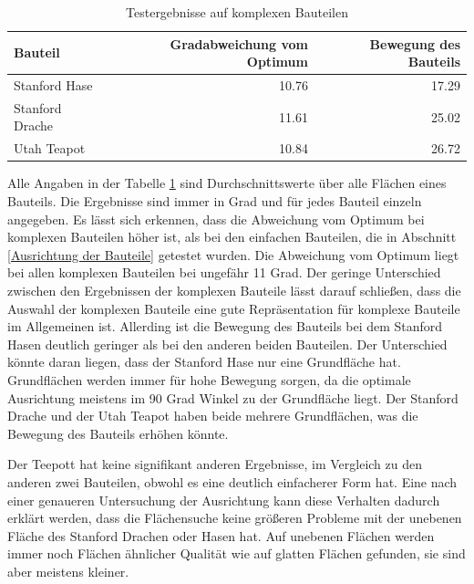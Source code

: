 \begin{table}[t]
\centering
\begin{tabular}{lrr}
\toprule
Bauteil & Gradabweichung vom Optimum & Bewegung des Bauteils\\
\midrule
Stanford Hase & 10.76 & 17.29 \\ \addlinespace
Stanford Drache & 11.61 & 25.02 \\ \addlinespace
Utah Teapot & 10.84 & 26.72\\
\bottomrule
\end{tabular}
\caption{Testergebnisse auf komplexen Bauteilen}
\label{table:Testergebnisse auf komplexen Bauteilen}
\end{table}

Alle Angaben in der Tabelle \ref{table:Testergebnisse auf komplexen Bauteilen} sind Durchschnittswerte über alle Flächen eines Bauteils. Die Ergebnisse sind immer in Grad und für jedes Bauteil einzeln angegeben. 
Es lässt sich erkennen, dass die Abweichung vom Optimum bei komplexen Bauteilen höher ist, als bei den einfachen Bauteilen, die in Abschnitt \ref{Ausrichtung der Bauteile} getestet wurden. Die Abweichung vom Optimum liegt bei allen komplexen Bauteilen bei ungefähr 11 Grad.
Der geringe Unterschied zwischen den Ergebnissen der komplexen Bauteile lässt darauf schließen, dass die Auswahl der komplexen Bauteile eine gute Repräsentation für komplexe Bauteile im Allgemeinen ist. 
Allerding ist die Bewegung des Bauteils bei dem Stanford Hasen deutlich geringer als bei den anderen beiden Bauteilen. Der Unterschied könnte daran liegen, dass der Stanford Hase nur eine Grundfläche hat. Grundflächen werden immer für hohe Bewegung sorgen, 
da die optimale Ausrichtung meistens im 90 Grad Winkel zu der Grundfläche liegt. Der Stanford Drache und der Utah Teapot haben beide mehrere Grundflächen, was die Bewegung des Bauteils erhöhen könnte. 

Der Teepott hat keine signifikant anderen Ergebnisse, im Vergleich zu den anderen zwei Bauteilen, obwohl es eine deutlich einfacherer Form hat. Eine nach einer genaueren Untersuchung der Ausrichtung kann diese Verhalten dadurch erklärt werden, 
dass die Flächensuche keine größeren Probleme mit der unebenen Fläche des Stanford Drachen oder Hasen hat. Auf unebenen Flächen werden immer noch Flächen ähnlicher Qualität wie auf glatten Flächen gefunden, sie sind aber meistens kleiner.


